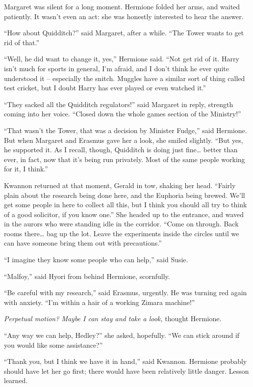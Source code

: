 Margaret was silent for a long moment. Hermione folded her arms, and
waited patiently. It wasn't even an act: she was honestly interested to
hear the answer.

``How about Quidditch?'' said Margaret, after a while. ``The Tower wants
to get rid of that.''

``Well, he did want to change it, yes,'' Hermione said. ``Not get rid of
it. Harry isn't much for sports in general, I'm afraid, and I don't
think he ever quite understood it -- especially the snitch. Muggles have
a similar sort of thing called test cricket, but I doubt Harry has ever
played or even watched it.''

``They sacked all the Quidditch regulators!'' said Margaret in reply,
strength coming into her voice. ``Closed down the whole games section of
the Ministry!''

``That wasn't the Tower, that was a decision by Minister Fudge,'' said
Hermione. But when Margaret and Erasmus gave her a look, she smiled
slightly. ``But yes, he supported it. As I recall, though, Quidditch is
doing just fine\ldots{} better than ever, in fact, now that it's being
run privately. Most of the same people working for it, I think.''

Kwannon returned at that moment, Gerald in tow, shaking her head.
``Fairly plain about the research being done here, and the Euphoria
being brewed. We'll get some people in here to collect all this, but I
think you should all try to think of a good solicitor, if you know
one.'' She headed up to the entrance, and waved in the aurors who were
standing idle in the corridor. ``Come on through. Back rooms
there\ldots{} bag up the lot. Leave the experiments inside the circles
until we can have someone bring them out with precautions.''

``I imagine they know some people who can help,'' said Susie.

``Malfoy,'' said Hyori from behind Hermione, scornfully.

``Be careful with my research,'' said Erasmus, urgently. He was turning
red again with anxiety. ``I'm within a hair of a working Zimara
machine!''

\emph{Perpetual motion? Maybe I can stay and take a look, }thought
Hermione.

``Any way we can help, Hedley?'' she asked, hopefully. ``We can stick
around if you would like some assistance?''

``Thank you, but I think we have it in hand,'' said Kwannon. Hermione
probably should have let her go first; there would have been relatively
little danger. Lesson learned.


